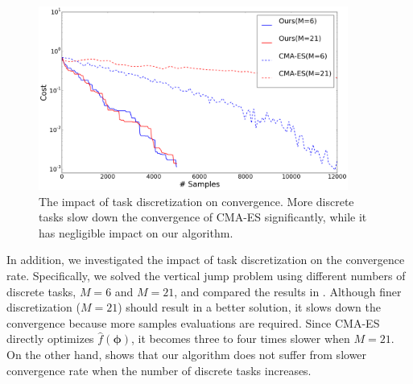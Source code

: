 \begin{figure}
\center
  \includegraphics[width=4.0in]{images/diff_M}
  \caption{The impact of task discretization on convergence. More
    discrete tasks slow down the convergence of CMA-ES significantly,
    while it has negligible impact on our algorithm.}

  \label{fig:optskills_diff_m}
\end{figure}

In addition, we investigated the impact of task discretization on the
convergence rate. Specifically, we solved the
vertical jump problem using different numbers of discrete tasks, $M =
6$ and $M = 21$, and compared the results in . Although
finer discretization ($M=21$) should result in a better solution, it
slows down the convergence because more samples
evaluations are required. Since CMA-ES directly optimizes
$\hat{f}({\boldsymbol{\phi}})$, it becomes three to four times slower
when $M = 21$. On the other hand,  shows that our algorithm does not suffer from
  slower convergence rate when the number of discrete tasks increases.


